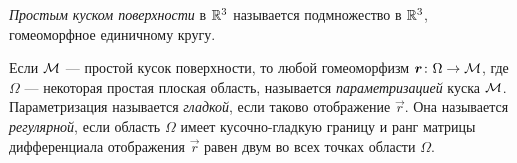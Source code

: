%
%
%
%
%

%
%

%

\begin{definition}
	\textit{Простым куском поверхности} в $\mathbb{R}^3$ называется подмножество в $\mathbb{R}^3$, гомеоморфное единичному кругу.
\end{definition}

\begin{definition}
	Если $\mathcal{M}$ --- простой кусок поверхности, то любой гомеоморфизм $\boldsymbol{r}\colon \Omega \to \mathcal{M}$, где $\Omega$ --- некоторая простая плоская область, называется \textit{параметризацией} куска $\mathcal{M}$. Параметризация называется \textit{гладкой}, если таково отображение $\vec{r}$. Она называется \textit{регулярной}, если область $\Omega$ имеет кусочно-гладкую границу и ранг матрицы дифференциала отображения $\vec{r}$ равен двум во всех точках области $\Omega$.
\end{definition}

